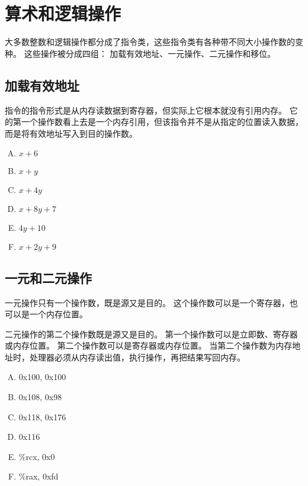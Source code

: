 
\section{算术和逻辑操作}
{
    大多数整数和逻辑操作都分成了指令类，这些指令类有各种带不同大小操作数的变种。
    这些操作被分成四组：
    加载有效地址、一元操作、二元操作和移位。

    \subsection{加载有效地址}
    {
        指令的指令形式是从内存读数据到寄存器，但实际上它根本就没有引用内存。
        它的第一个操作数看上去是一个内存引用，但该指令并不是从指定的位置读入数据，而是将有效地址写入到目的操作数。

        \begin{practicec}
            \begin{enumerate}[A.]
                \item $x + 6$
                \item $x + y$
                \item $x + 4y$
                \item $x + 8y + 7$
                \item $4y + 10$
                \item $x + 2y + 9$
            \end{enumerate}
        \end{practicec}

        \begin{practicec}
        \end{practicec}
    }

    \subsection{一元和二元操作}
    {
        一元操作只有一个操作数，既是源又是目的。
        这个操作数可以是一个寄存器，也可以是一个内存位置。

        二元操作的第二个操作数既是源又是目的。
        第一个操作数可以是立即数、寄存器或内存位置。
        第二个操作数可以是寄存器或内存位置。
        当第二个操作数为内存地址时，处理器必须从内存读出值，执行操作，再把结果写回内存。

        \begin{practicec}
            \begin{enumerate}[A.]
                \item 0x100, 0x100
                \item 0x108, 0x98
                \item 0x118, 0x176
                \item 0x116
                \item \%rcx, 0x0
                \item \%rax, 0xfd
            \end{enumerate}
        \end{practicec}
    }

}
